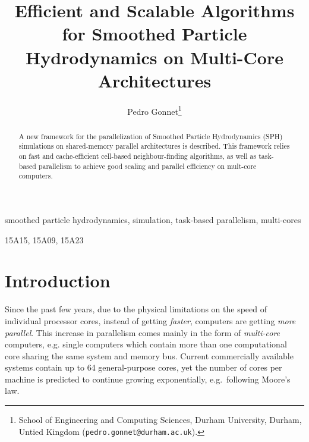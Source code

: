 \documentclass[final]{siamltex}
\date{}
\title{Efficient and Scalable Algorithms for Smoothed Particle Hydrodynamics on Multi-Core
    Architectures}
\author{Pedro Gonnet\thanks{School of Engineering and Computing Sciences,
    Durham University, Durham, Untied Kingdom ({\tt pedro.gonnet@durham.ac.uk}).}}
\begin{document}
\lstset{%
    language=C,
    basicstyle=\small\tt,
    numbers=left,
    numberstyle=\tiny
    }


\maketitle


\begin{abstract}
A new framework for the parallelization of Smoothed Particle Hydrodynamics (SPH)
simulations on shared-memory parallel architectures is described.
This framework relies on fast and cache-efficient cell-based neighbour-finding
algorithms, as well as task-based parallelism to achieve good scaling and
parallel efficiency on mult-core computers.
\end{abstract}


\begin{keywords} 
smoothed particle hydrodynamics,
simulation,
task-based parallelism,
multi-cores
\end{keywords}

\begin{AMS}
15A15, 15A09, 15A23
\end{AMS}

\pagestyle{myheadings}
\thispagestyle{plain}


\section{Introduction}

Since the past few years, due to the physical limitations
on the speed of individual processor cores, instead of
getting {\em faster}, computers are getting {\em more parallel}.
This increase in parallelism comes mainly in the form of
{\em multi-core} computers, e.g. single computers which
contain more than one computational core sharing the 
same system and memory bus.
Current commercially available systems contain up to 64
general-purpose cores, yet the number of cores per
machine is predicted to continue growing exponentially,
e.g.~following Moore's law.
\end{document}
